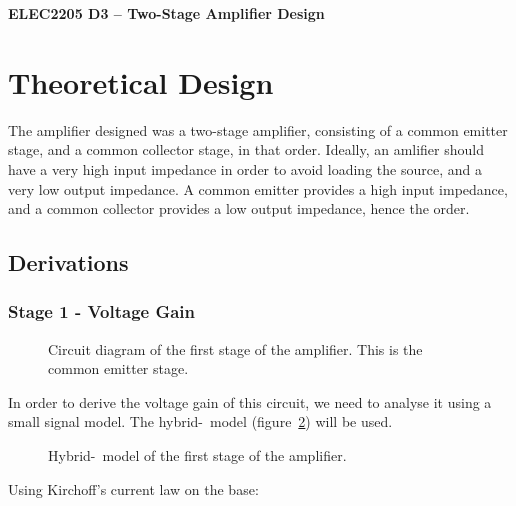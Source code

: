 \documentclass[a4paper,11pt]{article}
\begin{document}
  
\begin{center}
{\Large{\textbf{ELEC2205 D3 -- Two-Stage Amplifier Design}}} \\ [\baselineskip]

\end{center}

\begin{abstract}
\end{abstract}

\tableofcontents
\newpage

\section{Theoretical Design}
    The amplifier designed was a two-stage amplifier, consisting of a common emitter stage, and a common collector stage, in that order. Ideally, an amlifier should have a very high input impedance in order to avoid loading the source, and a very low output impedance. A common emitter provides a high input impedance, and a common collector provides a low output impedance, hence the order.
    
    \subsection{Derivations}
        \subsubsection{Stage 1 - Voltage Gain}

            \begin{figure}[h]
            \centering
                
                \caption{Circuit diagram of the first stage of the amplifier. This is the common emitter stage.}
                \label{fig:stage1}
            \end{figure}

            In order to derive the voltage gain of this circuit, we need to analyse it using a small signal model. The hybrid-\textpi\ model (figure~\ref{fig:stage1hpi}) will be used.

            \begin{figure}[h]
            \centering
                
                \caption{Hybrid-\textpi\ model of the first stage of the amplifier.}
                \label{fig:stage1hpi}
            \end{figure}

            Using Kirchoff's current law on the base:
\end{document}

